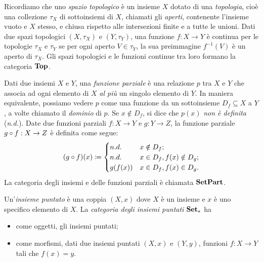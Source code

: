 \begin{example}\label{ex_cat_top}
	Ricordiamo che uno \emph{spazio topologico} è un insieme \(X\) dotato di una \emph{topologia}, cioè una collezione \(\tau_X\) di sottoinsiemi di \(X\), chiamati gli \emph{aperti}, contenente l'insieme vuoto e \(X\) stesso, e chiusa rispetto alle intersezioni finite e a tutte le unioni.
	Dati due spazi topologici \((X,\tau_X)\) e \((Y,\tau_Y)\), una funzione \(f:X\to Y\) è continua per le topologie \(\tau_X\) e \(\tau_Y\) se per ogni aperto \(V\in\tau_Y\), la sua preimmagine \(f^{-1}(V)\) è un aperto di \(\tau_X\).
	Gli spazi topologici e le funzioni continue tra loro formano la categoria \(\mathbf{Top}\).
\end{example}
\begin{example}\label{ex_cat_pfun}
	Dati due insiemi \(X\) e \(Y\), una \emph{funzione parziale} è una relazione \(p\) tra \(X\) e \(Y\) che associa ad ogni elemento di \(X\) \emph{al più} un singolo elemento di \(Y\). In maniera equivalente, possiamo vedere \(p\) come una funzione da un sottoinsieme \(D_f\subseteq X\) a \(Y\), a volte chiamato il \emph{dominio} di \(p\). Se \(x\notin D_f\), si dice che \(p(x)\) \emph{non è definita} (\emph{n.d.}).
	Date due funzioni parziali \(f:X\to Y\) e \(g:Y\to Z\), la funzione parziale \(g\circ f:X\to Z\) è definita come segue:
	\[
		(g\circ f) (x) \coloneqq \begin{cases}
			n.d.    & x\notin D_f ;              \\
			n.d.    & x\in D_f, f(x)\notin D_g ; \\
			g(f(x)) & x\in D_f, f(x)\in D_g .
		\end{cases}
	\]
	La categoria degli insiemi e delle funzioni parziali è chiamata \(\mathbf{SetPart}\).
\end{example}
\begin{example}\label{ex_cat_puntati}
	Un'\emph{insieme puntato} è una coppia \((X,x)\) dove \(X\) è un insieme e \(x\) è uno specifico elemento di \(X\).
	La \emph{categoria degli insiemi puntati} \(\mathbf{Set}_*\) ha
	\begin{itemize}
		\item come oggetti, gli insiemi puntati;
		\item come morfismi, dati due insiemi puntati \((X,x)\) e \((Y,y)\), funzioni \(f:X\to Y\) tali che \(f(x)=y\).
	\end{itemize}
\end{example}

